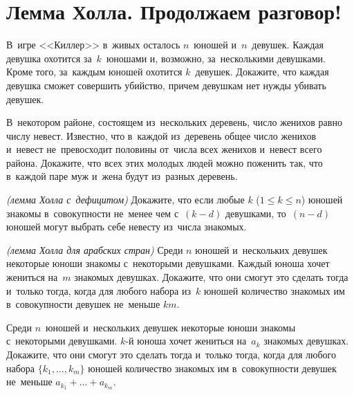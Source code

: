 
\section*{Лемма Холла. Продолжаем разговор!}



\begin{problems}

\item
В~игре <<Киллер>> в~живых осталось $n$~юношей и~$n$~девушек.
Каждая девушка охотится за~$k$~юношами и, возможно, за~несколькими девушками.
Кроме того, за~каждым юношей охотится $k$~девушек.
Докажите, что каждая девушка сможет совершить убийство, причем девушкам нет
нужды убивать девушек.

\item
В~некотором районе, состоящем из~нескольких деревень, число женихов равно числу
невест.
Известно, что в~каждой из~деревень общее число женихов и~невест не~превосходит
половины от~числа всех женихов и~невест всего района.
Докажите, что всех этих молодых людей можно поженить так, что в~каждой паре муж
и~жена будут из~разных деревень.

\item\emph{(лемма Холла с~дефицитом)}
Докажите, что если любые $k$ ($1 \leq k \leq n$) юношей знакомы в~совокупности
не~менее чем с~$(k - d)$ девушками, то~$(n - d)$ юношей могут выбрать себе
невесту из~числа знакомых.

\item\emph{(лемма Холла для арабских стран)}
Среди $n$ юношей и~нескольких девушек некоторые юноши знакомы с~некоторыми
девушками.
Каждый юноша хочет жениться на~$m$ знакомых девушках.
Докажите, что они смогут это сделать тогда и~только тогда, когда для любого
набора из~$k$ юношей количество знакомых им в~совокупности девушек
не~меньше $k m$.

\item
Среди $n$~юношей и~нескольких девушек некоторые юноши знакомы с~некоторыми
девушками.
$k$-й юноша хочет жениться на~$a_k$ знакомых девушках.
Докажите, что они смогут это сделать тогда и~только тогда, когда для любого
набора $\{k_1, \ldots, k_m\}$ юношей количество знакомых им в~совокупности
девушек не~меньше $a_{k_1} + \ldots + a_{k_m}$.


\end{problems}
